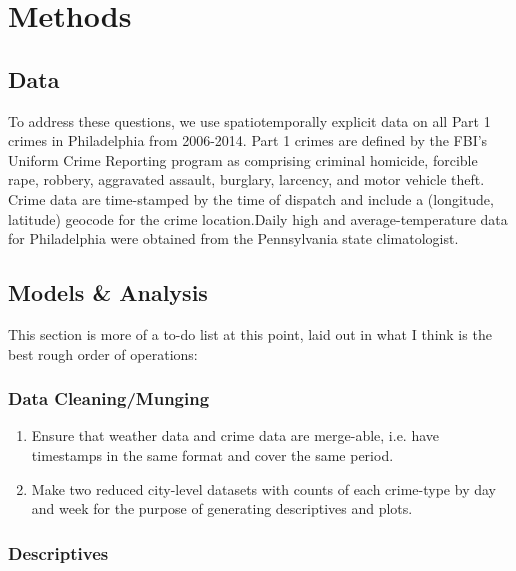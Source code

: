 \documentclass{article}\usepackage[]{graphicx}\usepackage[]{color}
\begin{document}
\section{Methods}

\subsection{Data}

To address these questions, we use spatiotemporally explicit data on all Part 1 crimes in Philadelphia from 2006-2014. Part 1 crimes are defined by the FBI's Uniform Crime Reporting program as comprising criminal homicide, forcible rape, robbery, aggravated assault, burglary, larcency, and motor vehicle theft. Crime data are time-stamped by the time of dispatch and include a (longitude, latitude) geocode for the crime location.Daily high and average-temperature data for Philadelphia were obtained from the Pennsylvania state climatologist.

\subsection{Models \& Analysis}

This section is more of a to-do list at this point, laid out in what I think is the best rough order of operations:

\subsubsection{Data Cleaning/Munging}

\begin{enumerate}

\item Ensure that weather data and crime data are merge-able, i.e. have timestamps in the same format and cover the same period.

\item Make two reduced city-level datasets with counts of each crime-type by day and week for the purpose of generating descriptives and plots.

\end{enumerate}

\subsubsection{Descriptives}
\end{document}
